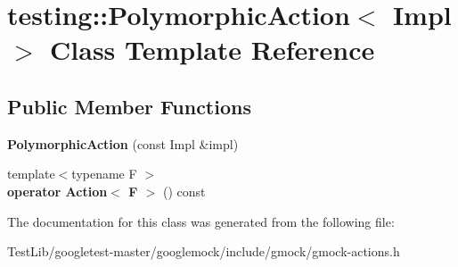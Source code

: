 \hypertarget{classtesting_1_1PolymorphicAction}{}\section{testing\+:\+:Polymorphic\+Action$<$ Impl $>$ Class Template Reference}
\label{classtesting_1_1PolymorphicAction}
\subsection*{Public Member Functions}
\begin{DoxyCompactItemize}
\item 
\mbox{\label{classtesting_1_1PolymorphicAction_a062e5a45ad61dcf8085b15cc882ca0ae}} 
{\bfseries Polymorphic\+Action} (const Impl \&impl)
\item 
\mbox{\label{classtesting_1_1PolymorphicAction_ac35461616cc15c06f1a2f9ee1c03fb8f}} 
{\footnotesize template$<$typename F $>$ }\\{\bfseries operator Action$<$ F $>$} () const
\end{DoxyCompactItemize}


The documentation for this class was generated from the following file\+:\begin{DoxyCompactItemize}
\item 
Test\+Lib/googletest-\/master/googlemock/include/gmock/gmock-\/actions.\+h\end{DoxyCompactItemize}
